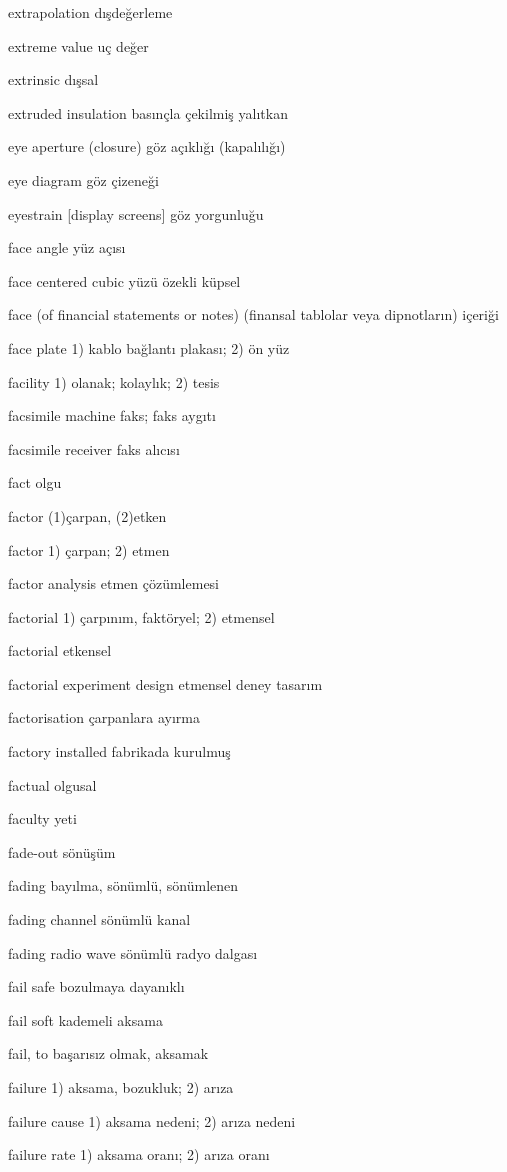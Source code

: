 \documentclass[12pt,fleqn]{article}\usepackage{../../common}
\begin{document}
extrapolation dışdeğerleme

extreme value uç değer

extrinsic dışsal

extruded insulation basınçla çekilmiş yalıtkan

eye aperture (closure) göz açıklığı (kapalılığı)

eye diagram göz çizeneği

eyestrain [display screens] göz yorgunluğu

face angle yüz açısı

face centered cubic yüzü özekli küpsel

face (of financial statements or notes) (finansal tablolar veya dipnotların) içeriği

face plate 1) kablo bağlantı plakası; 2) ön yüz

facility 1) olanak; kolaylık; 2) tesis

facsimile machine faks; faks aygıtı

facsimile receiver faks alıcısı

fact olgu

factor (1)çarpan, (2)etken

factor 1) çarpan; 2) etmen

factor analysis etmen çözümlemesi

factorial 1) çarpınım, faktöryel; 2) etmensel

factorial etkensel

factorial experiment design etmensel deney tasarım

factorisation çarpanlara ayırma

factory installed fabrikada kurulmuş

factual olgusal

faculty yeti

fade-out sönüşüm

fading bayılma, sönümlü, sönümlenen

fading channel sönümlü kanal

fading radio wave sönümlü radyo dalgası

fail safe bozulmaya dayanıklı

fail soft kademeli aksama

fail, to başarısız olmak, aksamak

failure 1) aksama, bozukluk; 2) arıza

failure cause 1) aksama nedeni; 2) arıza nedeni

failure rate 1) aksama oranı; 2) arıza oranı
\end{document}
